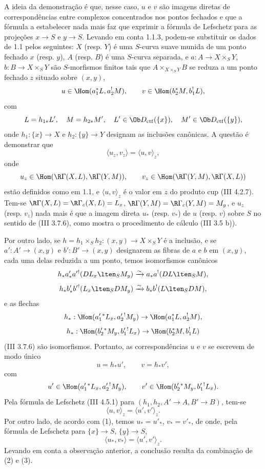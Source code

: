 A ideia da demonstração é que, nesse caso, $u$ e $v$ são imagens diretas de correspondências entre complexos concentrados nos pontos fechados e que a fórmula a estabelecer nada mais faz que exprimir a fórmula de Lefschetz para as projeções $x\to S$ e $y\to S$. Levando em conta 1.1.3, podem-se substituir os dados de 1.1 pelos seguintes: $X$ (resp. $Y$) é uma $S$-curva suave munida de um ponto fechado $x$ (resp. $y$), $A$ (resp. $B$) é uma $S$-curva separada, e $a:A\to X\times_S Y$, $b:B\to X\times_S Y$ são $S$-morfismos finitos tais que $A\times_{X\times_SY}B$ se reduza a um ponto fechado $z$ situado sobre $(x,y)$,
\[
u\in\Hom(a_1^*L,a_2^!M),\qquad v\in\Hom(b_2^*M,b_1^!L),
\]
com
\[
L=h_{1*}L',\quad M=h_{2*}M',\quad
L'\in\Ob D_{\mathrm{ctf}}(\{x\}),\quad M'\in\Ob D_{\mathrm{ctf}}(\{y\}),
\]
onde $h_1:\{x\}\to X$ e $h_2:\{y\}\to Y$ designam as inclusões canônicas. A questão é demonstrar que
\[
\langle u_z,v_z\rangle=\langle u,v\rangle_z,
\]
onde
\[
u_z\in\Hom(\R\Gamma(X,L),\R\Gamma(Y,M)),\qquad
v_z\in\Hom(\R\Gamma(Y,M),\R\Gamma(X,L))
\]
estão definidos como em 1.1, e $\langle u,v\rangle_z$ é o valor em $z$ do produto cup (III 4.2.7). Tem-se $\R\Gamma(X,L)=\R\Gamma_c(X,L)=L_x$, $\R\Gamma(Y,M)=\R\Gamma_c(Y,M)=M_y$, e $u_z$ (resp. $v_z$) nada mais é que a imagem direta $u_*$ (resp. $v_*$) de $u$ (resp. $v$) sobre $S$ no sentido de (III 3.7.6), como mostra o procedimento de cálculo (III 3.5 b)).

Por outro lado, se $h=h_1\times_Sh_2:(x,y)\to X\times_SY$ é a inclusão, e se $a':A'\to(x,y)$ e $b':B'\to(x,y)$ designarem as fibras de $a$ e $b$ em $(x,y)$, cada uma delas reduzida a um ponto, temos isomorfismos canônicos
\[
h_*a'_*a'{}^!(DL_x\lten_SM_y)
 \xrightarrow{\sim} a_*a^!(DL\lten_SM),
\]
\[
h_*b'_*b'{}^!(L_x\lten_SDM_y)
 \xrightarrow{\sim} b_*b^!(L\lten_SDM),
\]
e as flechas
\[
h_*:\Hom(a_1'{}^*L_x,a_2'{}^!M_y)\to \Hom(a_1^*L,a_2^!M),
\]
\[
h_*:\Hom(b_2'{}^*M_y,b_1'{}^!L_x)\to \Hom(b_2^*M,b_1^!L)
\]
(III 3.7.6) são isomorfismos. Portanto, as correspondências $u$ e $v$ se escrevem de modo único
\begin{equation}\tag{1}
u=h_*u',\qquad v=h_*v',
\end{equation}
com
\[
u'\in\Hom(a_1'{}^*L_x,a_2'{}^!M_y),\qquad
v'\in\Hom(b_2'{}^*M_y,b_1'{}^!L_x).
\]
Pela fórmula de Lefschetz (III 4.5.1) para $(h_1,h_2,A'\to A,B'\to B)$, tem-se
\begin{equation}\tag{2}
\langle u,v\rangle_z=\langle u',v'\rangle_z .
\end{equation}
Por outro lado, de acordo com (1), temos $u_*=u'_*$, $v_*=v'_*$, de onde, pela fórmula de Lefschetz para $\{x\}\to S$, $\{y\}\to S$,
\begin{equation}\tag{3}
\langle u_*,v_*\rangle=\langle u',v'\rangle_z .
\end{equation}
Levando em conta a observação anterior, a conclusão resulta da combinação de (2) e (3).
